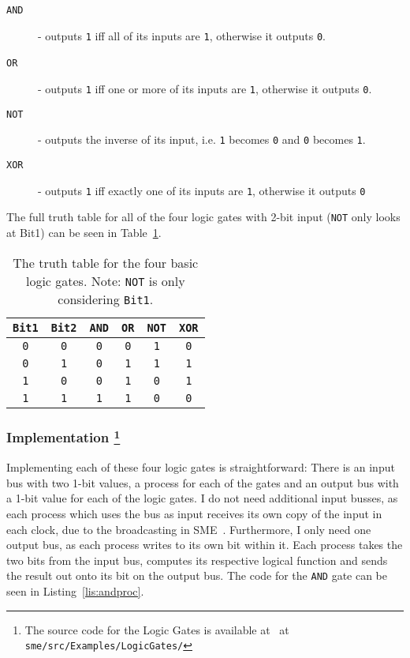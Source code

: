 \begin{description}
    \item[\texttt{AND}] - outputs \texttt{1} iff all of its inputs are
        \texttt{1}, otherwise it outputs \texttt{0}.

    \item[\texttt{OR}\ \ ] - outputs \texttt{1} iff one or more of its inputs are
        \texttt{1}, otherwise it outputs \texttt{0}.

    \item[\texttt{NOT}] - outputs the inverse of its input, i.e. \texttt{1}
        becomes \texttt{0} and \texttt{0} becomes \texttt{1}.

    \item[\texttt{XOR}] - outputs \texttt{1} iff exactly one of its inputs are
        \texttt{1}, otherwise it outputs \texttt{0}
\end{description}
The full truth table for all of the four logic gates with 2-bit input
(\texttt{NOT} only looks at Bit1) can be seen in Table~\ref{tab:truth-table}.

\begin{table}
    \centering
    \begin{tabular}{cc|cccc}
        \hline
        \texttt{Bit1} & \texttt{Bit2} & \texttt{AND} & \texttt{OR} &
        \texttt{NOT} & \texttt{XOR} \\
        \hline
        \texttt{0} & \texttt{0} & \texttt{0} & \texttt{0} & \texttt{1} &
            \texttt{0} \\
        \texttt{0} & \texttt{1} & \texttt{0} & \texttt{1} & \texttt{1} &
            \texttt{1} \\
        \texttt{1} & \texttt{0} & \texttt{0} & \texttt{1} & \texttt{0} &
            \texttt{1} \\
        \texttt{1} & \texttt{1} & \texttt{1} & \texttt{1} & \texttt{0} &
            \texttt{0} \\
        \hline
    \end{tabular}
    \caption{The truth table for the four basic logic gates. Note: \texttt{NOT}
    is only considering \texttt{Bit1}.}
    \label{tab:truth-table}
\end{table}

\subsubsection*{Implementation
\footnote{The source code for the Logic Gates is available at~\cite{ref:github}
at \texttt{sme/src/Examples/LogicGates/}}
}
Implementing each of these four logic gates is straightforward: There is an
input bus with two 1-bit values, a process for each of the gates and an output
bus with a 1-bit value for each of the logic gates. I do not need additional
input busses, as each process which uses the bus as input receives its own
copy of the input in each clock, due to the broadcasting in SME~\cite{ref:sme1}.
Furthermore, I only need one output bus, as each process
writes to its own bit within it. Each process takes the two bits from the input
bus, computes its respective logical function and sends the result out onto
its bit on the output bus. The code for the \texttt{AND} gate can be seen in
Listing~\ref{lis:andproc}.

